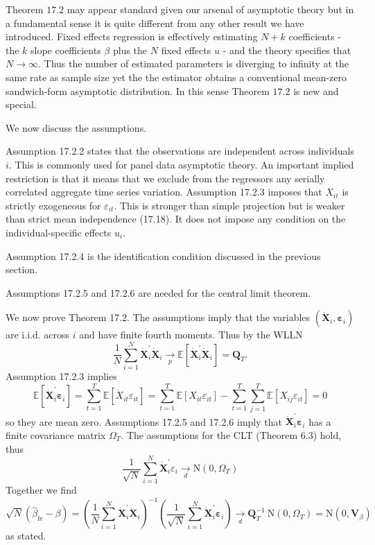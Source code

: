 \documentclass[10pt]{article}
\begin{document}
Theorem $17.2$ may appear standard given our arsenal of asymptotic theory but in a fundamental sense it is quite different from any other result we have introduced. Fixed effects regression is effectively estimating $N+k$ coefficients - the $k$ slope coefficients $\beta$ plus the $N$ fixed effects $u$ - and the theory specifies that $N \rightarrow \infty$. Thus the number of estimated parameters is diverging to infinity at the same rate as sample size yet the the estimator obtains a conventional mean-zero sandwich-form asymptotic distribution. In this sense Theorem $17.2$ is new and special.

We now discuss the assumptions.

Assumption 17.2.2 states that the observations are independent across individuals $i$. This is commonly used for panel data asymptotic theory. An important implied restriction is that it means that we exclude from the regressors any serially correlated aggregate time series variation. Assumption 17.2.3 imposes that $X_{i t}$ is strictly exogeneous for $\varepsilon_{i t}$. This is stronger than simple projection but is weaker than strict mean independence (17.18). It does not impose any condition on the individual-specific effects $u_{i}$.

Assumption 17.2.4 is the identification condition discussed in the previous section.

Assumptions 17.2.5 and 17.2.6 are needed for the central limit theorem.

We now prove Theorem 17.2. The assumptions imply that the variables $\left(\dot{\boldsymbol{X}}_{i}, \boldsymbol{\varepsilon}_{i}\right)$ are i.i.d. across $i$ and have finite fourth moments. Thus by the WLLN
$$
\frac{1}{N} \sum_{i=1}^{N} \dot{\boldsymbol{X}}_{i}^{\prime} \dot{\boldsymbol{X}}_{i} \underset{p}{\longrightarrow} \mathbb{E}\left[\dot{\boldsymbol{X}}_{i}^{\prime} \dot{\boldsymbol{X}}_{i}\right]=\boldsymbol{Q}_{T} .
$$
Assumption 17.2.3 implies
$$
\mathbb{E}\left[\dot{\boldsymbol{X}}_{i}^{\prime} \boldsymbol{\varepsilon}_{i}\right]=\sum_{t=1}^{T} \mathbb{E}\left[\dot{X}_{i t} \varepsilon_{i t}\right]=\sum_{t=1}^{T} \mathbb{E}\left[X_{i t} \varepsilon_{i t}\right]-\sum_{t=1}^{T} \sum_{j=1}^{T} \mathbb{E}\left[X_{i j} \varepsilon_{i t}\right]=0
$$
so they are mean zero. Assumptions 17.2.5 and 17.2.6 imply that $\dot{\boldsymbol{X}}_{i}^{\prime} \boldsymbol{\varepsilon}_{i}$ has a finite covariance matrix $\Omega_{T}$. The assumptions for the CLT (Theorem 6.3) hold, thus
$$
\frac{1}{\sqrt{N}} \sum_{i=1}^{N} \dot{\boldsymbol{X}}_{i}^{\prime} \varepsilon_{i} \underset{d}{\longrightarrow} \mathrm{N}\left(0, \Omega_{T}\right)
$$
Together we find
$$
\sqrt{N}\left(\widehat{\beta}_{\mathrm{fe}}-\beta\right)=\left(\frac{1}{N} \sum_{i=1}^{N} \dot{\boldsymbol{X}}_{i}^{\prime} \dot{\boldsymbol{X}}_{i}\right)^{-1}\left(\frac{1}{\sqrt{N}} \sum_{i=1}^{N} \dot{\boldsymbol{X}}_{i}^{\prime} \boldsymbol{\varepsilon}_{i}\right) \underset{d}{\longrightarrow} \boldsymbol{Q}_{T}^{-1} \mathrm{~N}\left(0, \Omega_{T}\right)=\mathrm{N}\left(0, \boldsymbol{V}_{\beta}\right)
$$
as stated.
\end{document}
